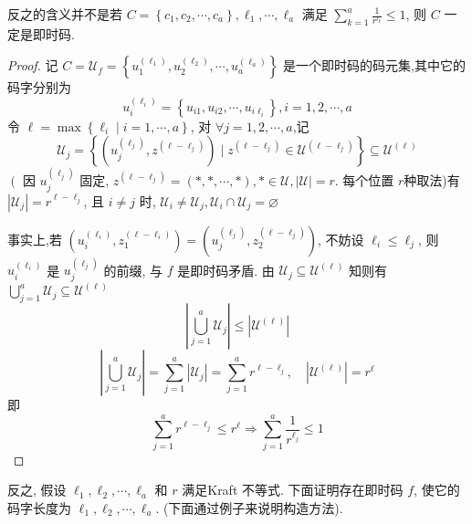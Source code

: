 \begin{remark}
反之的含义并不是若 $ C=\left\{c_{1}, c_{2}, \cdots, c_{a}\right\}, \ell_{1}, \cdots, \ell_{a} $ 满足 $ \sum\limits_{k=1}^{a} \frac{1}{r^{l_{k}}} \leq 1 $, 则 $ C $ 一定是即时码.
\end{remark}

\begin{proof}
记 $ C=\mathscr{U}_{f}=\left\{u_{1}^{\left(\ell_{1}\right)}, u_{2}^{\left(\ell_{2}\right)}, \cdots, u_{a}^{\left(\ell_{a}\right)}\right\} $ 是一个即时码的码元集,其中它的码字分别为
$$
u_{i}^{\left(\ell_{i}\right)}=\left\{u_{i 1}, u_{i 2}, \cdots, u_{i \ell_{i}}\right\}, i=1,2, \cdots, a
$$
令 $ \ell=\max \left\{\ell_{i} \mid i=1, \cdots, a\right\} $, 对 $ \forall j=1,2, \cdots, a $,记 
$$ \mathscr{U}_{j}=\left\{\left(u_{j}^{\left(\ell_{j}\right)}, z^{\left(\ell-\ell_{j}\right)}\right) \mid z^{\left(\ell-\ell_{j}\right)} \in \mathscr{U}^{\left(\ell-\ell_{j}\right)}\right\} \subseteq \mathscr{U}^{(\ell)} $$
$ \left(\right. $ 因 $ u_{j}^{\left(\ell_{j}\right)} $ 固定, $ z^{\left(\ell-\ell_{j}\right)}=(*, *, \cdots, *), * \in \mathscr{U},|\mathscr{U}|=r $. 每个位置 $ r $种取法)有
$ \left|\mathscr{U}_{j}\right|=r^{\ell-\ell_{j}} $, 且 $ i \neq j $ 时, $ \mathscr{U}_{i} \neq \mathscr{U}_{j}, \mathscr{U}_{i} \cap \mathscr{U}_{j}=\varnothing $

事实上,若 $ \left(u_{i}^{\left(\ell_{i}\right)}, z_{1}^{\left(\ell-\ell_{i}\right)}\right)=\left(u_{j}^{\left(\ell_{j}\right)}, z_{2}^{\left(\ell-\ell_{j}\right)}\right) $, 不妨设 $ \ell_{i} \leq \ell_{j} $,
则 $ u_{i}^{\left(\ell_{i}\right)} $ 是 $ u_{j}^{\left(\ell_{j}\right)} $ 的前缀, 与 $ f $ 是即时码矛盾. 由 $ \mathscr{U}_{j} \subseteq \mathscr{U}^{(\ell)} $ 知则有 $ \bigcup\limits_{j=1}^{a} \mathscr{U}_{j} \subseteq \mathscr{U}^{(\ell)} $
$$
\left|\bigcup_{j=1}^{a} \mathscr{U}_{j}\right| \leq\left|\mathscr{U}^{(\ell)}\right| $$
$$
\left|\bigcup_{j=1}^{a} \mathscr{U}_{j}\right|=\sum_{j=1}^{a}\left|\mathscr{U}_{j}\right|=\sum_{j=1}^{a} r^{\ell-\ell_{j}} ,\quad\left|\mathscr{U}^{(\ell)}\right|=r^{\ell} $$
即 $$ \sum_{j=1}^{a} r^{\ell-\ell_{j}} \leq r^{\ell} \Rightarrow \sum_{j=1}^{a} \frac{1}{r^{\ell_{j}}} \leq 1 $$
\end{proof}

反之, 假设 $ \ell_{1}, \ell_{2}, \cdots, \ell_{a} $ 和 $ r $ 满足Kraft 不等式. 下面证明存在即时码 $ f $, 使它的码字长度为 $ \ell_{1}, \ell_{2}, \cdots, \ell_{a} $. (下面通过例子来说明构造方法).

